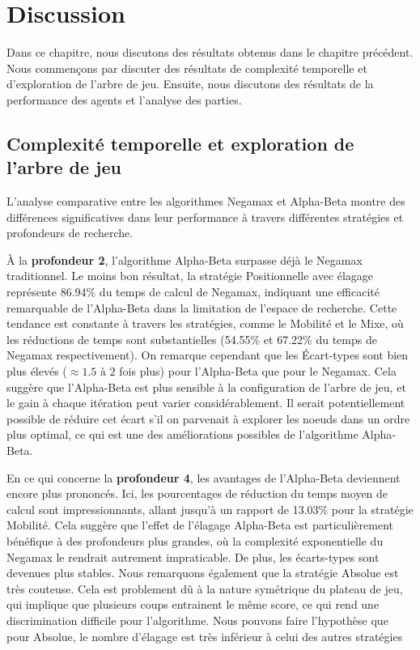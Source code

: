 \chapter{Discussion}
\label{chap:discussion}

Dans ce chapitre, nous discutons des résultats obtenus dans le chapitre précédent. Nous commençons par discuter des résultats de complexité temporelle et d'exploration de l'arbre de jeu. Ensuite, nous discutons des résultats de la performance des agents et l'analyse des parties.

\section{Complexité temporelle et exploration de l'arbre de jeu}
L'analyse comparative entre les algorithmes Negamax et Alpha-Beta montre des différences significatives dans leur performance à travers différentes stratégies et profondeurs de recherche.

À la \textbf{profondeur 2}, l'algorithme Alpha-Beta surpasse déjà le Negamax traditionnel. Le moins bon résultat, la  stratégie Positionnelle avec élagage représente 86.94\% du temps de calcul de Negamax, indiquant une efficacité remarquable de l'Alpha-Beta dans la limitation de l'espace de recherche. Cette tendance est constante à travers les stratégies, comme le Mobilité et le Mixe, où les réductions de temps sont substantielles (54.55\% et 67.22\% du temps de Negamax respectivement). On remarque cependant que les Écart-types sont bien plus élevés ($\approx 1.5 \,\, \text{à} \,\, 2$ fois plus) pour l'Alpha-Beta que pour le Negamax. Cela suggère que l'Alpha-Beta est plus sensible à la configuration de l'arbre de jeu, et le gain à chaque itération peut varier considérablement. Il serait potentiellement possible de réduire cet écart s'il on parvenait à explorer les noeuds dans un ordre plus optimal, ce qui est une des améliorations possibles de l'algorithme Alpha-Beta.

En ce qui concerne la \textbf{profondeur 4}, les avantages de l'Alpha-Beta deviennent encore plus prononcés. Ici, les pourcentages de réduction du temps moyen de calcul sont impressionnants, allant jusqu'à un rapport de 13.03\% pour la stratégie Mobilité. Cela suggère que l'effet de l'élagage Alpha-Beta est particulièrement bénéfique à des profondeurs plus grandes, où la complexité exponentielle du Negamax le rendrait autrement impraticable. De plus, les écarts-types sont devenues plus stables. Nous remarquons également que la stratégie Absolue est très couteuse. Cela est problement dû à la nature symétrique du plateau de jeu, qui implique que plusieurs coups entrainent le même score, ce qui rend une discrimination difficile pour l'algorithme. Nous pouvons faire l'hypothèse que pour Absolue, le nombre d'élagage est très inférieur à celui des autres stratégies


